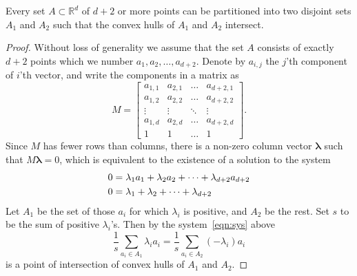 \documentclass[12pt]{article}
\begin{document}
Every set $A\subset \mathbb{R}^d$ of $d+2$ or more points can be partitioned into two disjoint sets $A_1$ and $A_2$ such that the convex hulls of $A_1$ and $A_2$ intersect.

\begin{proof}
Without loss of generality we assume that the set $A$ consists of exactly $d+2$ points which we number $a_1, a_2,\dotsc, a_{d+2}$. Denote by $a_{i,j}$ the $j$'th component of $i$'th vector, and write the components in a matrix as
\begin{equation*}
M=\begin{bmatrix}
a_{1,1}&a_{2,1}&\dots&a_{d+2,1}\\
a_{1,2}&a_{2,2}&\dots&a_{d+2,2}\\
\vdots& \vdots&\ddots & \vdots\\
a_{1,d}&a_{2,d}&\dots&a_{d+2,d}\\
1&1&\dots&1
\end{bmatrix}.
\end{equation*}
Since $M$ has fewer rows than columns, there is a non-zero column vector $\mathbf{\lambda}$ such that $M \mathbf{\lambda}=0$, which is equivalent to the existence of a solution to the system
\begin{align}\label{eqn:sys}
0&=\lambda_1 a_1+\lambda_2 a_2+\dotsb+\lambda_{d+2} a_{d+2}\\
0&=\lambda_1+\lambda_2+\dotsb+\lambda_{d+2}\notag
\end{align}
Let $A_1$ be the set of those $a_i$ for which $\lambda_i$ is positive, and $A_2$ be the rest. Set $s$ to be the sum of positive $\lambda_i$'s. Then by the system~\eqref{eqn:sys} above 
\begin{equation*}
\frac{1}{s}\sum_{a_i\in A_1} \lambda_i a_i=\frac{1}{s}\sum_{a_i\in A_2} (-\lambda_i) a_i
\end{equation*}
is a point of intersection of convex hulls of $A_1$ and $A_2$.
\end{proof}
\end{document}
